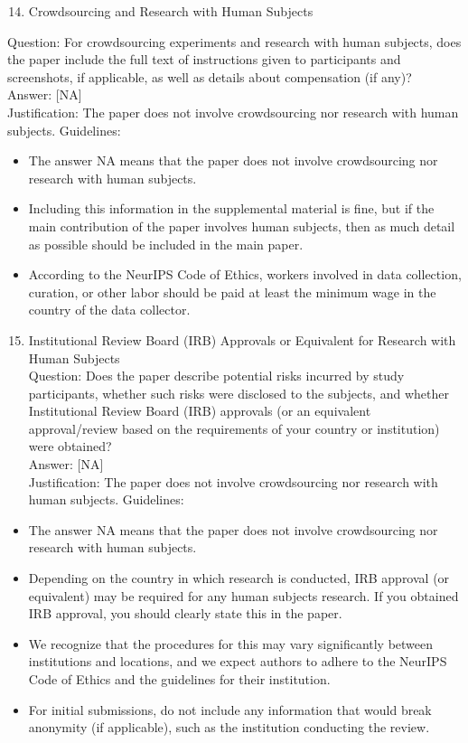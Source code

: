 \documentclass[10pt]{article}
\begin{document}
\begin{enumerate}
  \setcounter{enumi}{13}
  \item Crowdsourcing and Research with Human Subjects
\end{enumerate}

Question: For crowdsourcing experiments and research with human subjects, does the paper include the full text of instructions given to participants and screenshots, if applicable, as well as details about compensation (if any)?\\[0pt]
Answer: [NA]\\
Justification: The paper does not involve crowdsourcing nor research with human subjects. Guidelines:

\begin{itemize}
  \item The answer NA means that the paper does not involve crowdsourcing nor research with human subjects.
  \item Including this information in the supplemental material is fine, but if the main contribution of the paper involves human subjects, then as much detail as possible should be included in the main paper.
  \item According to the NeurIPS Code of Ethics, workers involved in data collection, curation, or other labor should be paid at least the minimum wage in the country of the data collector.
\end{itemize}

\begin{enumerate}
  \setcounter{enumi}{14}
  \item Institutional Review Board (IRB) Approvals or Equivalent for Research with Human Subjects\\
Question: Does the paper describe potential risks incurred by study participants, whether such risks were disclosed to the subjects, and whether Institutional Review Board (IRB) approvals (or an equivalent approval/review based on the requirements of your country or institution) were obtained?\\[0pt]
Answer: [NA]\\
Justification: The paper does not involve crowdsourcing nor research with human subjects. Guidelines:
\end{enumerate}

\begin{itemize}
  \item The answer NA means that the paper does not involve crowdsourcing nor research with human subjects.
  \item Depending on the country in which research is conducted, IRB approval (or equivalent) may be required for any human subjects research. If you obtained IRB approval, you should clearly state this in the paper.
  \item We recognize that the procedures for this may vary significantly between institutions and locations, and we expect authors to adhere to the NeurIPS Code of Ethics and the guidelines for their institution.
  \item For initial submissions, do not include any information that would break anonymity (if applicable), such as the institution conducting the review.
\end{itemize}
\end{document}
